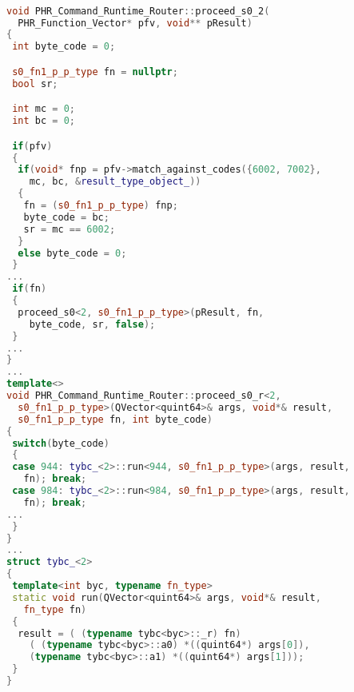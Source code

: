 \begin{lstlisting}[caption={Identifying Function 
 Equivalence Classes},
language = C++, numbers = none, label={lst:figPVMrt},
    basicstyle = \ttfamily\bfseries\tiny, linewidth = .95\linewidth] 

void PHR_Command_Runtime_Router::proceed_s0_2(
  PHR_Function_Vector* pfv, void** pResult)
{
 int byte_code = 0;

 s0_fn1_p_p_type fn = nullptr;
 bool sr;

 int mc = 0;
 int bc = 0;

 if(pfv)
 {
  if(void* fnp = pfv->match_against_codes({6002, 7002}, 
    mc, bc, &result_type_object_))
  {
   fn = (s0_fn1_p_p_type) fnp;
   byte_code = bc;
   sr = mc == 6002;
  }
  else byte_code = 0;
 }
... 
 if(fn)
 {
  proceed_s0<2, s0_fn1_p_p_type>(pResult, fn, 
    byte_code, sr, false);
 }
...
}
...
template<>
void PHR_Command_Runtime_Router::proceed_s0_r<2, 
  s0_fn1_p_p_type>(QVector<quint64>& args, void*& result,
  s0_fn1_p_p_type fn, int byte_code)
{
 switch(byte_code)
 {
 case 944: tybc_<2>::run<944, s0_fn1_p_p_type>(args, result, 
   fn); break;
 case 984: tybc_<2>::run<984, s0_fn1_p_p_type>(args, result, 
   fn); break;
...
 }
}
...
struct tybc_<2>
{
 template<int byc, typename fn_type>
 static void run(QVector<quint64>& args, void*& result,
   fn_type fn)
 {
  result = ( (typename tybc<byc>::_r) fn)
    ( (typename tybc<byc>::a0) *((quint64*) args[0]),  
    (typename tybc<byc>::a1) *((quint64*) args[1]));
 }
}


\end{lstlisting}

